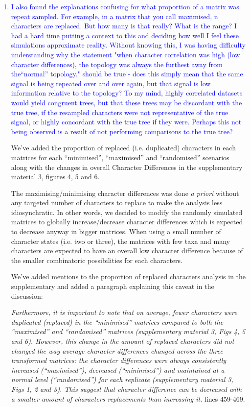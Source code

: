 \documentclass[12pt,letterpaper]{article}
\begin{document}
\begin{enumerate}
\item{\textcolor{blue}{I also found the explanations confusing for what proportion of a matrix was repeat sampled. For example, in a matrix that you call maximised, n characters are replaced. But how many is that really? What is the range? I had a hard time putting a context to this and deciding how well I feel these simulations approximate reality. Without knowing this, I was having difficulty understanding why the statement "when character correlation was high (low character differences), the topology was always the furthest away from the``normal'' topology." 
should be true - does this simply mean that the same signal is being repeated over and over again, but that signal is low information relative to the topology? To my mind, highly correlated datasets would yield congruent trees, but that these trees may be discordant with the true tree, if the resampled characters were not representative of the true signal, or highly concordant with the true tree if they were. Perhaps this not being observed is a result of not performing comparisons to the true tree?}}

We've added the proportion of replaced (i.e. duplicated) characters in each matrices for each ``minimised'', ``maximised'' and ``randomised'' scenarios along with the changes in overall Character Differences in the supplementary material 3, figures 4, 5 and 6.

The maximising/minimising character differences was done \textit{a priori} without any targeted number of characters to replace to make the analysis less idiosynchratic.
In other words, we decided to modify the randomly simulated matrices to globally increase/decrease character differences which is expected to decrease anyway in bigger matrices.
When using a small number of character states (i.e. two or three), the matrices with few taxa and many characters are expected to have an overall low character difference because of the smaller combinatoric possibilities for each characters.

We've added mentions to the proportion of replaced characters analysis in the supplementary and added a paragraph explaining this caveat in the discussion:

\textit{Furthermore, it is important to note that on average, fewer characters were duplicated (replaced) in the ``minimised'' matrices compared to both the ``maximised'' and ``randomised'' matrices (supplementary material 3, Figs 4, 5 and 6).
However, this change in the amount of replaced characters did not changed the way average character differences changed across the three transformed matrices: the character differences were always consistently increased (``maximised''), decreased (``minimised'') and maintained at a normal level (``randomised'') for each replicate (supplementary material 3, Figs 1, 2 and 3).
This suggest that character difference can be decreased with a smaller amount of characters replacements than increasing it.} lines 459-469.


\end{enumerate}
\end{document}
